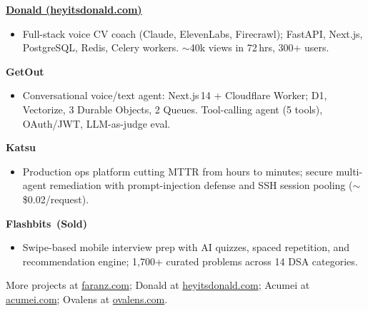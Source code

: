 \documentclass[10pt,a4paper]{article}
\newcommand{\cvmeta}[1]{\small #1}
\newcommand{\cvproject}[2]{\textbf{#1} \hfill \textit{#2}\vspace{1pt}}
\newcommand{\smallgap}{\vspace{1pt}}
\begin{document}
\cvproject{\href{https://heyitsdonald.com}{Donald (heyitsdonald.com)}}{}
\begin{itemize}
  \item Full-stack voice CV coach (Claude, ElevenLabs, Firecrawl); FastAPI, Next.js, PostgreSQL, Redis, Celery workers. \(\sim\)40k views in 72\,hrs, 300+ users.
\end{itemize}
\smallgap

\cvproject{GetOut}{}
\begin{itemize}
  \item Conversational voice/text agent: Next.js\,14 + Cloudflare Worker; D1, Vectorize, 3 Durable Objects, 2 Queues. Tool-calling agent (5 tools), OAuth/JWT, LLM-as-judge eval.
\end{itemize}
\smallgap

\cvproject{Katsu}{}
\begin{itemize}
  \item Production ops platform cutting MTTR from hours to minutes; secure multi-agent remediation with prompt-injection defense and SSH session pooling (\(\sim\)\$0.02/request).
\end{itemize}
\smallgap

\cvproject{Flashbits \,(Sold)}{}
\begin{itemize}
  \item Swipe-based mobile interview prep with AI quizzes, spaced repetition, and recommendation engine; 1{,}700+ curated problems across 14 DSA categories.
\end{itemize}

\vfill
\cvmeta{More projects at \href{https://faranz.com}{faranz.com}; Donald at \href{https://heyitsdonald.com}{heyitsdonald.com}; Acumei at \href{https://acumei.com}{acumei.com}; Ovalens at \href{https://ovalens.com}{ovalens.com}.}
\end{document}
